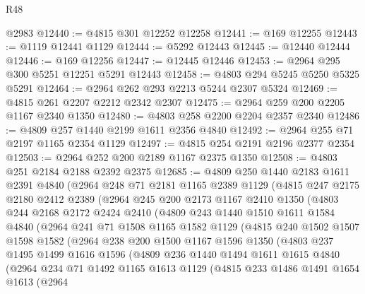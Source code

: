 \begin{lexlean}{R48}
\begin{coremodule}
    @2983
@12440 := @4815 @301 @12252 @12258
@12441 := @169 @12255
@12443 := @1119 @12441 @1129
@12444 := @5292 @12443
@12445 := @12440 @12444
@12446 := @169 @12256
@12447 := @12445 @12446
@12453 := @2964 @295 @300 @5251 @12251 @5291 @12443
@12458 := @4803 @294 @5245 @5250 @5325 @5291
@12464 := @2964 @262 @293 @2213 @5244 @2307 @5324
@12469 := @4815 @261 @2207 @2212 @2342 @2307
@12475 := @2964 @259 @200 @2205 @1167 @2340 @1350
@12480 := @4803 @258 @2200 @2204 @2357 @2340
@12486 := @4809 @257 @1440 @2199 @1611 @2356 @4840
@12492 := @2964 @255 @71 @2197 @1165 @2354 @1129
@12497 := @4815 @254 @2191 @2196 @2377 @2354
@12503 := @2964 @252 @200 @2189 @1167 @2375 @1350
@12508 := @4803 @251 @2184 @2188 @2392 @2375
@12685 := @4809
    @250
    @1440
    @2183
    @1611
    @2391
    @4840
    (@2964
      @248
      @71
      @2181
      @1165
      @2389
      @1129
      (@4815
        @247
        @2175
        @2180
        @2412
        @2389
        (@2964
          @245
          @200
          @2173
          @1167
          @2410
          @1350
          (@4803
            @244
            @2168
            @2172
            @2424
            @2410
            (@4809
              @243
              @1440
              @1510
              @1611
              @1584
              @4840
              (@2964
                @241
                @71
                @1508
                @1165
                @1582
                @1129
                (@4815
                  @240
                  @1502
                  @1507
                  @1598
                  @1582
                  (@2964
                    @238
                    @200
                    @1500
                    @1167
                    @1596
                    @1350
                    (@4803
                      @237
                      @1495
                      @1499
                      @1616
                      @1596
                      (@4809
                        @236
                        @1440
                        @1494
                        @1611
                        @1615
                        @4840
                        (@2964
                          @234
                          @71
                          @1492
                          @1165
                          @1613
                          @1129
                          (@4815
                            @233
                            @1486
                            @1491
                            @1654
                            @1613
                            (@2964

\end{coremodule}
\end{lexlean}

